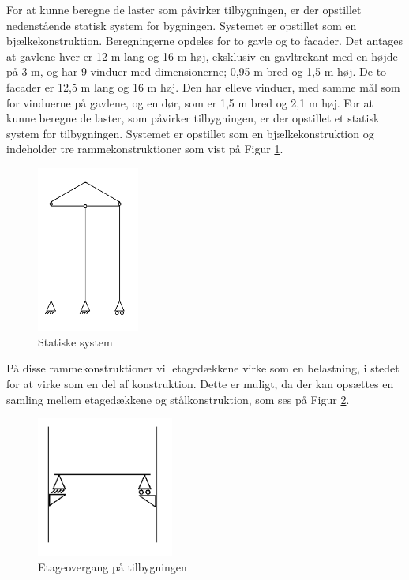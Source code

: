 For at kunne beregne de laster som påvirker tilbygningen, er der opstillet nedenstående statisk system for bygningen. Systemet er opstillet som en bjælkekonstruktion.
\newline
\newline
Beregningerne opdeles for to gavle og to facader. Det antages at gavlene hver er 12 m lang og 16 m høj, eksklusiv en gavltrekant med en højde på 3 m, og har 9 vinduer med dimensionerne; 0,95 m bred og 1,5 m høj.
\newline
\newline
De to facader er 12,5 m lang og 16 m høj. Den har elleve vinduer, med samme mål som for vinduerne på gavlene, og en dør, som er 1,5 m bred og 2,1 m høj.
\newline
\newline
For at kunne beregne de laster, som påvirker tilbygningen, er der opstillet et statisk system for tilbygningen. Systemet er opstillet som en bjælkekonstruktion og indeholder tre rammekonstruktioner som vist på Figur \ref{fig:system}.

\begin{figure}[htbp]
	\centering
	\includegraphics[width=0.3\textwidth]{billeder/del1statiskesystem.png}
	\caption{Statiske system}
	\label{fig:system}
\end{figure}

På disse rammekonstruktioner vil etagedækkene virke som en belastning, i stedet for at virke som en del af konstruktion. Dette er muligt, da der kan opsættes en samling mellem etagedækkene og stålkonstruktion, som ses på Figur \ref{fig:etage}.

\begin{figure}[htbp]
	\centering
	\includegraphics[width=0.4\textwidth]{billeder/etageovergang.png}
	\caption{Etageovergang på tilbygningen}
	\label{fig:etage}
\end{figure}

